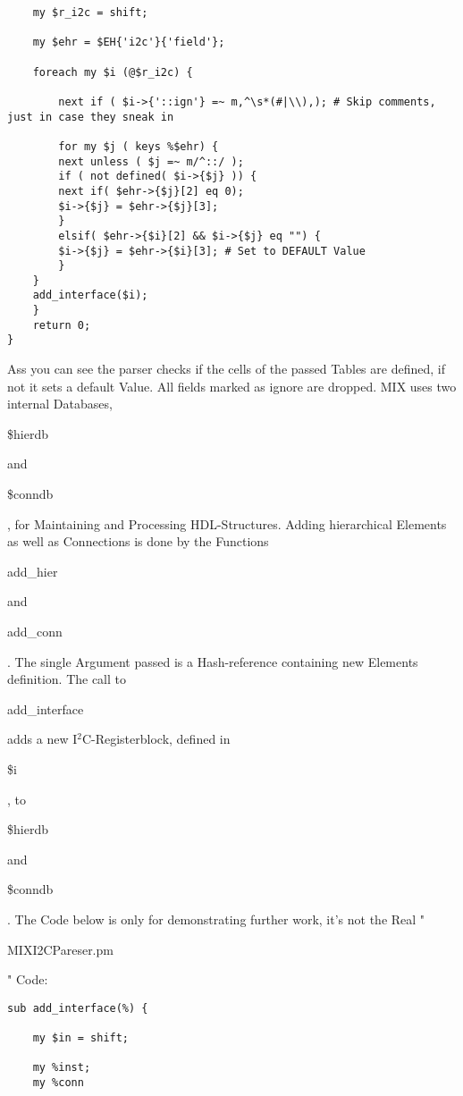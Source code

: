 \documentclass[a4paper,12pt]{article}
\begin{document}
{\begin{verbatim}
    my $r_i2c = shift;

    my $ehr = $EH{'i2c'}{'field'};

    foreach my $i (@$r_i2c) {

        next if ( $i->{'::ign'} =~ m,^\s*(#|\\),); # Skip comments, just in case they sneak in

        for my $j ( keys %$ehr) {
	    next unless ( $j =~ m/^::/ );
	    if ( not defined( $i->{$j} )) {
		next if( $ehr->{$j}[2] eq 0);
		$i->{$j} = $ehr->{$j}[3];
	    }
	    elsif( $ehr->{$i}[2] && $i->{$j} eq "") {
		$i->{$j} = $ehr->{$i}[3]; # Set to DEFAULT Value
	    }
	}
	add_interface($i);
    }
    return 0;
}
\end{verbatim}
Ass you can see the parser checks if the cells of the passed Tables are defined, if not it sets a default Value. All fields marked as ignore are dropped.\newline
MIX uses two internal Databases, \begin{tt}\$hierdb\end{tt} and \begin{tt}\$conndb\end{tt}, for Maintaining and Processing HDL-Structures. Adding hierarchical Elements as well as Connections is done by the Functions \begin{tt}add\_hier\end{tt} and \begin{tt}add\_conn\end{tt}. The single Argument passed is a Hash-reference containing new Elements definition. The call to \begin{tt}add\_interface\end{tt} adds a new I$^2$C-Registerblock, defined in \begin{tt}\$i\end{tt}, to \begin{tt}\$hierdb\end{tt} and \begin{tt}\$conndb\end{tt}. The Code below is only for demonstrating further work, it's not the Real "\begin{tt}MIXI2CPareser.pm\end{tt}" Code:\newline
\begin{verbatim}
sub add_interface(%) {

    my $in = shift;

    my %inst;
    my %conn


\end{verbatim}}
\end{document}
